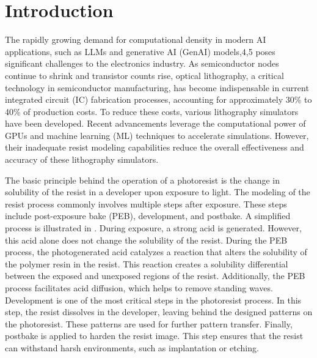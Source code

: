 
\section{Introduction}


The rapidly growing demand for computational density in modern AI applications, such as LLMs \cite{liu2024deepseek,achiam2023gpt,wang2024moreaupruner} and generative AI (GenAI)\cite{rombach2022high,wang2023evaluation} models,4,5 poses significant challenges to the electronics industry. As semiconductor nodes continue to shrink and transistor counts rise, optical lithography\cite{mack2007fundamental}, a critical technology in semiconductor manufacturing, has become indispensable in current integrated circuit (IC) fabrication processes, accounting for approximately 30\% to 40\% of production costs. To reduce these costs, various lithography simulators have been developed\cite{banerjee2013iccad,chen2024open,fuilt,watanabe2017accurate,fuhner2014artificial}. Recent advancements leverage the computational power of GPUs and machine learning (ML)\cite{yu2007true,wang2023diffpattern,watanabe2017accurate,wang2024chatpattern,chen2024ultra} techniques to accelerate simulations. However, their inadequate resist modeling capabilities reduce the overall effectiveness and accuracy of these lithography simulators.


The basic principle behind the operation of a photoresist is the change in solubility of the resist in a developer upon exposure to light\cite{mack2007fundamental}. The modeling of the resist process\cite{dill1975characterization,mack1987development} commonly involves multiple steps after exposure. These steps include post-exposure bake (PEB), development, and postbake. A simplified process is illustrated in . During exposure, a strong acid is generated. However, this acid alone does not change the solubility of the resist. During the PEB process, the photogenerated acid catalyzes a reaction that alters the solubility of the polymer resin in the resist. This reaction creates a solubility differential between the exposed and unexposed regions of the resist. Additionally, the PEB process facilitates acid diffusion, which helps to remove standing waves. Development\cite{sethian1996fast} is one of the most critical steps in the photoresist process. In this step, the resist dissolves in the developer, leaving behind the designed patterns on the photoresist. These patterns are used for further pattern transfer. Finally, postbake is applied to harden the resist image. This step ensures that the resist can withstand harsh environments, such as implantation or etching. 

